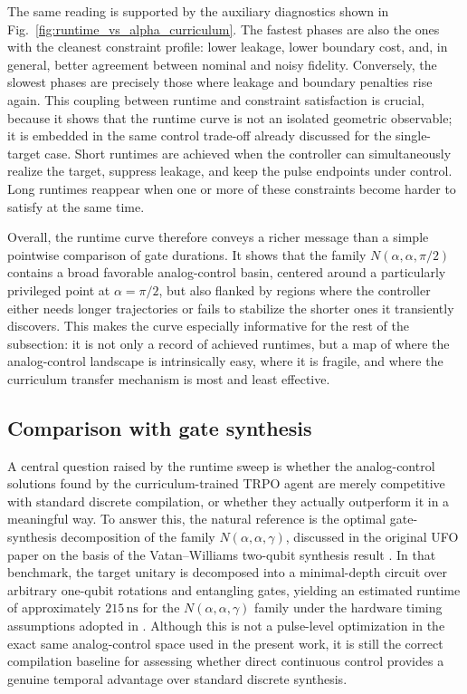 The same reading is supported by the auxiliary diagnostics shown in
Fig.~\ref{fig:runtime_vs_alpha_curriculum}. The fastest phases are
also the ones with the cleanest constraint profile: lower leakage, lower boundary cost, and, in general, better
agreement between nominal and noisy fidelity. Conversely, the slowest phases are precisely those where leakage and
boundary penalties rise again. This coupling between runtime and constraint satisfaction is crucial, because it
shows that the runtime curve is not an isolated geometric observable; it is embedded in the same control trade-off
already discussed for the single-target case. Short runtimes are achieved when the controller can simultaneously
realize the target, suppress leakage, and keep the pulse endpoints under control. Long runtimes reappear when one
or more of these constraints become harder to satisfy at the same time.

Overall, the runtime curve therefore conveys a richer message than a simple pointwise comparison of gate durations.
It shows that the family \(N(\alpha,\alpha,\pi/2)\) contains a broad favorable analog-control basin, centered
around a particularly privileged point at \(\alpha=\pi/2\), but also flanked by regions where the controller
either needs longer trajectories or fails to stabilize the shorter ones it transiently discovers. This makes the
curve especially informative for the rest of the subsection: it is not only a record of achieved runtimes, but a
map of where the analog-control landscape is intrinsically easy, where it is fragile, and where the curriculum
transfer mechanism is most and least effective.

\subsection{Comparison with gate synthesis}
\label{subsec:comparison_gate_synthesis}

A central question raised by the runtime sweep is whether the analog-control solutions found by the curriculum-trained
TRPO agent are merely competitive with standard discrete compilation, or whether they actually outperform it in a
meaningful way. To answer this, the natural reference is the optimal gate-synthesis decomposition of the family
\(N(\alpha,\alpha,\gamma)\), discussed in the original UFO paper on the basis of the Vatan--Williams two-qubit
synthesis result \cite{VatanWilliams2004,Niu2019}. In that benchmark, the target unitary is decomposed into a
minimal-depth circuit over arbitrary one-qubit rotations and entangling gates, yielding an estimated runtime of
approximately \(215\,\mathrm{ns}\) for the \(N(\alpha,\alpha,\gamma)\) family under the hardware timing assumptions
adopted in \cite{Niu2019}. Although this is not a pulse-level optimization in the exact same analog-control space
used in the present work, it is still the correct compilation baseline for assessing whether direct continuous
control provides a genuine temporal advantage over standard discrete synthesis.

